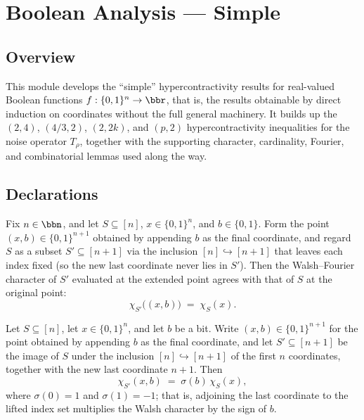 \chapter{Boolean Analysis — Simple}
\section{Overview}

This module develops the ``simple'' hypercontractivity results for real-valued
Boolean functions $f : \{0,1\}^n \to \bbr$, that is, the results obtainable by
direct induction on coordinates without the full general machinery. It builds up
the $(2,4)$, $(4/3,2)$, $(2,2k)$, and $(p,2)$ hypercontractivity inequalities for
the noise operator $T_\rho$, together with the supporting character, cardinality,
Fourier, and combinatorial lemmas used along the way.

\section{Declarations}

\begin{lemma}
\label{BooleanAnalysis.Hypercontractivity.chiS_snoc_castSucc}
\leanok
{}
Fix $n\in\bbn$, and let $S\subseteq[n]$, $x\in\{0,1\}^n$, and $b\in\{0,1\}$. Form the
point $(x,b)\in\{0,1\}^{n+1}$ obtained by appending $b$ as the final coordinate, and
regard $S$ as a subset $S'\subseteq[n+1]$ via the inclusion $[n]\hookrightarrow[n+1]$
that leaves each index fixed (so the new last coordinate never lies in $S'$). Then the
Walsh--Fourier character of $S'$ evaluated at the extended point agrees with that of $S$
at the original point:
\[
  \chi_{S'}\big((x,b)\big) \;=\; \chi_S(x).
\]
\end{lemma}

\begin{lemma}
\label{BooleanAnalysis.Hypercontractivity.chiS_snoc_with_last}
\leanok
{}
Let $S \subseteq [n]$, let $x \in \{0,1\}^n$, and let $b$ be a bit. Write $(x,b) \in
\{0,1\}^{n+1}$ for the point obtained by appending $b$ as the final coordinate, and let
$S' \subseteq [n+1]$ be the image of $S$ under the inclusion $[n] \hookrightarrow [n+1]$
of the first $n$ coordinates, together with the new last coordinate $n+1$. Then
\[
  \chi_{S'}(x,b) \;=\; \sigma(b)\,\chi_S(x),
\]
where $\sigma(0)=1$ and $\sigma(1)=-1$; that is, adjoining the last coordinate to the
lifted index set multiplies the Walsh character by the sign of $b$.
\end{lemma}


